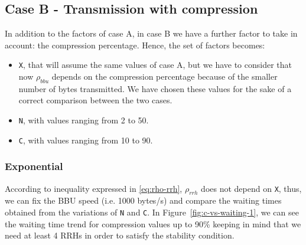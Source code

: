 \documentclass[11pt,a4paper,oneside, openright]{article}
\begin{document}
\subsection{Case B - Transmission with compression}
In addition to the factors of case A, in case B we have a further factor to take in account: the compression percentage. Hence, the set of factors becomes:

\begin{itemize}
	\item \texttt{X}, that will assume the same values of case A, but we have to consider that now $ \rho_{bbu} $ depends on the compression percentage because of the smaller number of bytes transmitted. We have chosen these values for the sake of a correct comparison between the two cases.
	\item \texttt{N}, with values ranging from 2 to 50.
	\item \texttt{C}, with values ranging from 10 to 90.
\end{itemize}

\subsubsection{Exponential}
According to inequality expressed in \ref{eq:rho-rrh}, $ \rho_{rrh} $ does not depend on \texttt{X}, thus, we can fix the BBU speed (i.e. 1000 bytes/s) and compare the waiting times obtained from the variations of \texttt{N} and \texttt{C}. In Figure~\ref{fig:c-vs-waiting-1}, we can see the waiting time trend for compression values up to 90\% keeping in mind that we need at least 4 RRHs in order to satisfy the stability condition.
\end{document}
